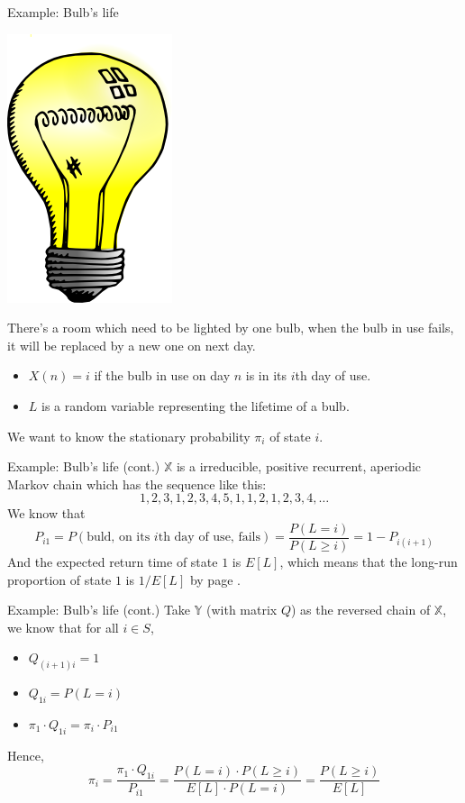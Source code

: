 \documentclass[mathserif]{beamer}
\begin{document}
\begin{frame}{Example: Bulb's life}
\begin{center}
\includegraphics[scale=0.1]{light_bulb_1.png}
\end{center}
There's a room which need to be lighted by one bulb, when the bulb in use fails, it will be replaced by a new one on next day.
\begin{itemize}
\item $X(n) = i$ if the bulb in use on day $n$ is in its $i$th day of use.
\item $L$ is a random variable representing the lifetime of a bulb.
\end{itemize}
We want to know the stationary probability $\pi_i$ of state $i$.
\end{frame}

\begin{frame}{Example: Bulb's life (cont.)}
$\mathbb{X}$ is a irreducible, positive recurrent, aperiodic Markov chain which has the sequence like this:
\[
1,2,3,1,2,3,4,5,1,1,2,1,2,3,4,\ldots
\]
We know that
\[
P_{i1} = P(\text{buld, on its $i$th day of use, fails}) = \frac{P(L=i)}{P(L\geq i)} = 1 - P_{i(i+1)}
\]
And the expected return time of state $1$ is $E[L]$, which means that the long-run proportion of state $1$ is $1/E[L]$ by page \pageref{pro_value}.
\end{frame}

\begin{frame}{Example: Bulb's life (cont.)}
Take $\mathbb{Y}$ (with matrix $Q$) as the reversed chain of $\mathbb{X}$, we know that for all $i\in S$,
\begin{itemize}
\item $Q_{(i+1)i} = 1$
\item $Q_{1i} = P(L = i)$
\item $\pi_1\cdot Q_{1i} = \pi_i\cdot P_{i1}$
\end{itemize}
Hence,
\[
\pi_i = \frac{\pi_1\cdot Q_{1i}}{P_{i1}} = 
\frac{P(L=i)\cdot P(L\geq i)}{E[L]\cdot P(L=i)} = \frac{P(L\geq i)}{E[L]}
\]
\end{frame}
\end{document}

